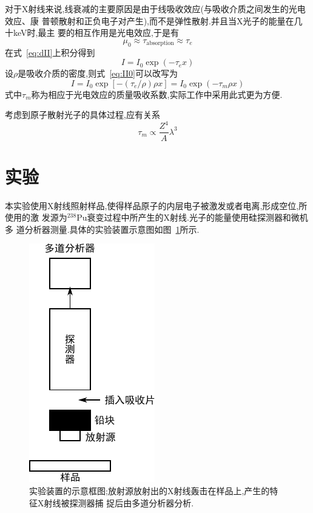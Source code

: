 \documentclass[aps,pre,12pt,preprint,onecolumn,showpacs,showkeys]{revtex4-1}
\begin{document}
对于X射线来说,线衰减的主要原因是由于线吸收效应(与吸收介质之间发生的光电效应、康
普顿散射和正负电子对产生),而不是弹性散射.并且当X光子的能量在几十\si{keV}时,最主
要的相互作用是光电效应,于是有
\begin{equation}
    \mu_0 \approx \tau_{\text{absorption}} \approx \tau_e
\end{equation}
在式~\ref{eq:dII}上积分得到
\begin{equation}
    \label{eq:II0}
    I = I_0 \exp( - \tau_e x)
\end{equation}
设$\rho$是吸收介质的密度,则式~\ref{eq:II0}可以改写为
\begin{equation}
    I = I_0\exp[-(\tau_e/\rho)\rho x] = I_0\exp(-\tau_m\rho x)
\end{equation}
式中$\tau_m$称为相应于光电效应的质量吸收系数,实际工作中采用此式更为方便.

考虑到原子散射光子的具体过程,应有关系
\begin{equation}
    \tau_m \propto \frac{Z^4}{A}\lambda^3
\end{equation}

\section{实验}

本实验使用X射线照射样品,使得样品原子的内层电子被激发或者电离,形成空位,所使用的激
发源为$^{238}\text{Pu}$衰变过程中所产生的X射线.光子的能量使用硅探测器和微机多
道分析器测量.具体的实验装置示意图如图~\ref{fig:ins}所示.

\begin{figure}[htbp]
  \centering
\includegraphics[width=.3\textwidth]{drawing.pdf}
\caption{\label{fig:ins}%
    实验装置的示意框图;放射源放射出的X射线轰击在样品上,产生的特征X射线被探测器捕
    捉后由多道分析器分析.
}
\end{figure}
\end{document}
